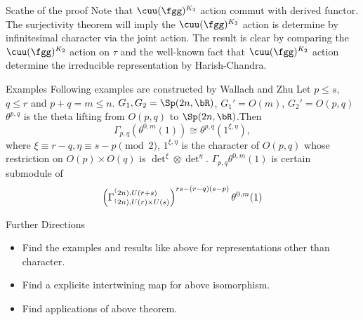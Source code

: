 \documentclass[final,hyperref={pdfpagelabels=false}]{beamer} %
\begin{document}
\begin{frame}
\begin{columns}
\begin{column}{.49\textwidth}
\begin{block}{Scathe of the proof}
  Note that $\cuu(\fgg)^{K_2}$ action commut with derived functor. 
  The surjectivity theorem will imply the $\cuu(\fgg)^{K_2}$ action is determine by
  infinitesimal character via the joint action.
  The result is clear by  comparing the $\cuu(\fgg)^{K_2}$ action on $\tau$
  and the well-known fact that $\cuu(\fgg)^{K_2}$ action determine the 
  irreducible representation by Harish-Chandra.
\end{block}

\begin{block}{Examples}
      Following examples are constructed by Wallach and Zhu
      Let $p\leq s$, $q\leq r$ and $p+q=m\leq n$.  
      $G_1,G_2 = \Sp(2n,\bR)$, $G_1' = O(m)$, $G_2'=O(p,q)$ 
      $\theta^{p,q}$ is the theta lifting from $O(p,q)$ to
      $\Sp(2n,\bR)$.Then 
      \[
      \displaystyle
      \Gamma_{p,q}(\theta^{0,m}(1)) \cong \theta^{p,q}(1^{\xi,\eta}),\]
      where $
      \xi \equiv r-q, \eta\equiv s-p \pmod{2}$,
      $1^{\xi,\eta}$ is the character of $O(p,q)$
      whose restriction on $O(p)\times O(q)$ is
      $\det^\xi\otimes \det^\eta$. 
      $\Gamma_{p,q}\theta^{0,m}(1)$ is certain submodule of
      \[
      \left(\Gamma_{\sp(2n),U(r)\times U(s)}^{\sp(2n),
          U(r+s)}\right)^{rs-(r-q)(s-p)}\theta^{0,m}(1)
      \]
    \end{block}
 
     \begin{block}{Further Directions}
       \begin{minipage}{\textwidth}
         \begin{itemize}
           \item Find the examples and results like above for representations other than character.
           \item Find a explicite intertwining map for above isomorphism.
           \item Find applications of above theorem.
         \end{itemize}
       \end{minipage}
     \end{block}

     \vfill
%         
    \end{column}
  \end{columns}
 \end{frame}
\end{document}
